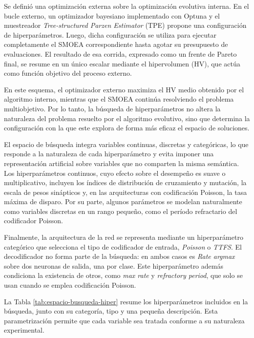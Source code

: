 Se definió una optimización externa sobre la optimización evolutiva interna. En el bucle externo, un optimizador bayesiano implementado con Optuna \cite{akiba2019optuna} y el muestreador \textit{Tree-structured Parzen Estimator} (TPE) propone una configuración de hiperparámetros. Luego, dicha configuración se utiliza para ejecutar completamente el SMOEA correspondiente hasta agotar su presupuesto de evaluaciones. El resultado de esa corrida, expresado como un frente de Pareto final, se resume en un único escalar mediante el hipervolumen (HV), que actúa como función objetivo del proceso externo.

En este esquema, el optimizador externo maximiza el HV medio obtenido por el algoritmo interno, mientras que el SMOEA continúa resolviendo el problema multiobjetivo. Por lo tanto, la búsqueda de hiperparámetros no altera la naturaleza del problema resuelto por el algoritmo evolutivo, sino que determina la configuración con la que este explora de forma más eficaz el espacio de soluciones.

El espacio de búsqueda integra variables continuas, discretas y categóricas, lo que responde a la naturaleza de cada hiperparámetro y evita imponer una representación artificial sobre variables que no comparten la misma semántica. Los hiperparámetros continuos, cuyo efecto sobre el desempeño es suave o multiplicativo, incluyen los índices de distribución de cruzamiento y mutación, la escala de pesos sinápticos y, en las arquitecturas con codificación Poisson, la tasa máxima de disparo. Por su parte, algunos parámetros se modelan naturalmente como variables discretas en un rango pequeño, como el período refractario del codificador Poisson.

Finalmente, la arquitectura de la red se representa mediante un hiperparámetro categórico que selecciona el tipo de codificador de entrada, \textit{Poisson} o \textit{TTFS}. El decodificador no forma parte de la búsqueda: en ambos casos es \textit{Rate argmax} sobre dos neuronas de salida, una por clase. Este hiperparámetro además condiciona la existencia de otros, como \textit{max rate} y \textit{refractory period}, que solo se usan cuando se emplea codificación Poisson.

La Tabla \ref{tab:espacio-busqueda-hiper} resume los hiperparámetros incluidos en la búsqueda, junto con su categoría, tipo y una pequeña descripción. Esta parametrización permite que cada variable sea tratada conforme a su naturaleza experimental.

